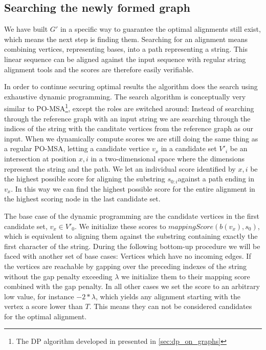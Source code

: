 \documentclass[thesis.tex]{subfiles}
\begin{document}
\subsection{Searching the newly formed graph}
We have built $G'$ in a specific way to guarantee the optimal alignments still exist, which means the next step is finding them. Searching for an alignment means combining vertices, representing bases, into a path representing a string. This linear sequence can be aligned against the input sequence with regular string alignment tools and the scores are therefore easily verifiable.\\
\par\noindent
In order to continue securing optimal results the algorithm does the search using exhaustive dynamic programming. The search algorithm is conceptually very similar to PO-MSA\footnote{The DP algorithm developed in \cite{multiple_sequence_alignment_using_partial_order_graphs} presented in \ref{sec:dp_on_graphs}}, except the roles are switched around: Instead of searching through the reference graph with an input string we are searching through the indices of the string with the canditate vertices from the reference graph as our input. When we dynamically compute scores we are still doing the same thing as a regular PO-MSA, letting a candidate vertice $v_x$ in a candidate set $V'_i$ be an intersection at position $x, i$ in a two-dimensional space where the dimensions represent the string and the path. We let an individual score identified by $x, i$ be the highest possible score for aligning the substring $s_{0:i}$against a path ending in $v_x$. In this way we can find the highest possible score for the entire alignment in the highest scoring node in the last candidate set.\\
\par\noindent
The base case of the dynamic programming are the candidate vertices in the first candidate set, $v_x \in V'_0$. We initialize these scores to $mappingScore(b(v_x), s_0)$, which is equivalent to aligning them against the substring containing exactly the first character of the string. During the following bottom-up procedure we will be faced with another set of base cases: Vertices which have no incoming edges. If the vertices are reachable by gapping over the preceding indexes of the string without the gap penalty exceeding $\lambda$ we initialize them to their mapping score combined with the gap penalty. In all other cases we set the score to an arbitrary low value, for instance $-2 * \lambda$, which yields any alignment starting with the vertex a score lower than $T$. This means they can not be considered candidates for the optimal alignment.\\
\end{document}
